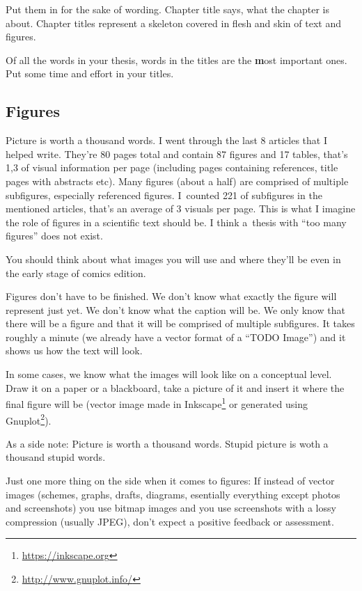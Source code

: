{{Put them in for the sake of wording. Chapter title says, what the chapter is about. Chapter titles represent a skeleton covered in flesh and skin of text and figures.

Of all the words in your thesis, words in the titles are the \textbf most important ones\rm. Put some time and effort in your titles.

\subsection*{Figures}

Picture is worth a thousand words. I went through the last 8 articles that I helped write. They're 80 pages total and contain 87 figures and 17 tables, that's 1,3 of visual information per page (including pages containing references, title pages with abstracts etc). Many figures (about a half) are comprised of multiple subfigures, especially referenced figures. I~counted 221 of subfigures in the mentioned articles, that's an average of 3 visuals per page. This is what I imagine the role of figures in a scientific text should be. I think a~thesis with ``too many figures'' does not exist.

You should think about what images you will use and where they'll be even in the early stage of comics edition.

Figures don't have to be finished. We don't know what exactly the figure will represent just yet. We don't know what the caption will be. We only know that there will be a figure and that it will be comprised of multiple subfigures. It takes roughly a minute (we already have a vector format of a ``TODO Image'') and it shows us how the text will look.

In some cases, we know what the images will look like on a conceptual level. Draw it on a paper or a blackboard, take a picture of it and insert it where the final figure will be (vector image made in Inkscape\footnote{\url{https://inkscape.org}} or generated using Gnuplot\footnote{\url{http://www.gnuplot.info/}}).

As a side note: Picture is worth a thousand words. Stupid picture is woth a thousand stupid words.

Just one more thing on the side when it comes to figures: If instead of vector images (schemes, graphs, drafts, diagrams, esentially everything except photos and screenshots) you use bitmap images and you use screenshots with a lossy compression (usually JPEG), don't expect a positive feedback or assessment.

}}
